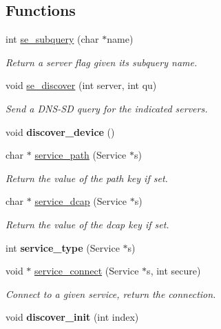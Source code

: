 \subsection*{Functions}
\begin{DoxyCompactItemize}
\item 
int \hyperlink{group__se__discover_ga57f13e11b0b429523f50ae0157aa920d}{se\+\_\+subquery} (char $\ast$name)
\begin{DoxyCompactList}\small\item\em Return a server flag given its subquery name. \end{DoxyCompactList}\item 
void \hyperlink{group__se__discover_gae649b86b4ed028c6288574dc69af24ae}{se\+\_\+discover} (int server, int qu)
\begin{DoxyCompactList}\small\item\em Send a D\+N\+S-\/\+SD query for the indicated servers. \end{DoxyCompactList}\item 
\mbox{\label{group__se__discover_ga62876295a90c1dae0a7564a18b2a2517}} 
void {\bfseries discover\+\_\+device} ()
\item 
char $\ast$ \hyperlink{group__se__discover_ga773e278c046c45a0d411bbb49cf2adea}{service\+\_\+path} (Service $\ast$s)
\begin{DoxyCompactList}\small\item\em Return the value of the \textquotesingle{}path\textquotesingle{} key if set. \end{DoxyCompactList}\item 
char $\ast$ \hyperlink{group__se__discover_ga761f59dc096114f53a72b58bfe77d281}{service\+\_\+dcap} (Service $\ast$s)
\begin{DoxyCompactList}\small\item\em Return the value of the \textquotesingle{}dcap\textquotesingle{} key if set. \end{DoxyCompactList}\item 
\mbox{\label{group__se__discover_ga22eb8b74c90f083ed7e0349424e46ec9}} 
int {\bfseries service\+\_\+type} (Service $\ast$s)
\item 
void $\ast$ \hyperlink{group__se__discover_ga2a10a4f15dbb85e5b0b93379f9e48ae8}{service\+\_\+connect} (Service $\ast$s, int secure)
\begin{DoxyCompactList}\small\item\em Connect to a given service, return the connection. \end{DoxyCompactList}\item 
\mbox{\label{group__se__discover_ga5e102de91a6d3a494bf00ceaaaedca72}} 
void {\bfseries discover\+\_\+init} (int index)
\end{DoxyCompactItemize}


